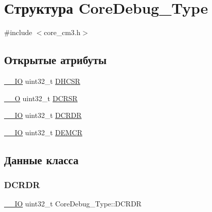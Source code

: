\hypertarget{struct_core_debug___type}{}\section{Структура Core\+Debug\+\_\+\+Type}
\label{struct_core_debug___type}


{\ttfamily \#include $<$core\+\_\+cm3.\+h$>$}

\subsection*{Открытые атрибуты}
\begin{DoxyCompactItemize}
\item 
\mbox{\hyperlink{group___c_m_s_i_s___c_m3__core__definitions_gaec43007d9998a0a0e01faede4133d6be}{\+\_\+\+\_\+\+IO}} uint32\+\_\+t \mbox{\hyperlink{struct_core_debug___type_a25c14c022c73a725a1736e903431095d}{D\+H\+C\+SR}}
\item 
\mbox{\hyperlink{group___c_m_s_i_s___c_m3__core__definitions_ga7e25d9380f9ef903923964322e71f2f6}{\+\_\+\+\_\+O}} uint32\+\_\+t \mbox{\hyperlink{struct_core_debug___type_afefa84bce7497652353a1b76d405d983}{D\+C\+R\+SR}}
\item 
\mbox{\hyperlink{group___c_m_s_i_s___c_m3__core__definitions_gaec43007d9998a0a0e01faede4133d6be}{\+\_\+\+\_\+\+IO}} uint32\+\_\+t \mbox{\hyperlink{struct_core_debug___type_ab8f4bb076402b61f7be6308075a789c9}{D\+C\+R\+DR}}
\item 
\mbox{\hyperlink{group___c_m_s_i_s___c_m3__core__definitions_gaec43007d9998a0a0e01faede4133d6be}{\+\_\+\+\_\+\+IO}} uint32\+\_\+t \mbox{\hyperlink{struct_core_debug___type_a5cdd51dbe3ebb7041880714430edd52d}{D\+E\+M\+CR}}
\end{DoxyCompactItemize}


\subsection{Данные класса}
\mbox{\label{struct_core_debug___type_ab8f4bb076402b61f7be6308075a789c9}} 
\subsubsection{\texorpdfstring{DCRDR}{DCRDR}}
{\footnotesize\ttfamily \mbox{\hyperlink{group___c_m_s_i_s___c_m3__core__definitions_gaec43007d9998a0a0e01faede4133d6be}{\+\_\+\+\_\+\+IO}} uint32\+\_\+t Core\+Debug\+\_\+\+Type\+::\+D\+C\+R\+DR}

